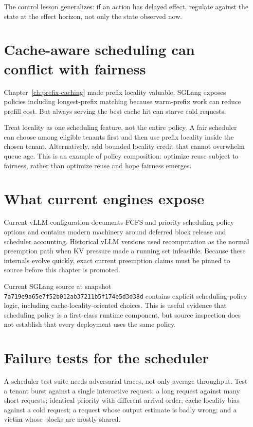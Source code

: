 The control lesson generalizes: if an action has delayed effect, regulate against the
state at the effect horizon, not only the state observed now.

\section{Cache-aware scheduling can conflict with fairness}

Chapter~\ref{ch:prefix-caching} made prefix locality valuable. SGLang exposes policies
including longest-prefix matching because warm-prefix work can reduce prefill cost.
But always serving the best cache hit can starve cold requests.

Treat locality as one scheduling feature, not the entire policy. A fair scheduler can
choose among eligible tenants first and then use prefix locality inside the chosen
tenant. Alternatively, add bounded locality credit that cannot overwhelm queue age.
This is an example of policy composition: optimize reuse subject to fairness, rather
than optimize reuse and hope fairness emerges.

\section{What current engines expose}

Current vLLM configuration documents FCFS and priority scheduling policy options and
contains modern machinery around deferred block release and scheduler accounting.
Historical vLLM versions used recomputation as the normal preemption path when KV
pressure made a running set infeasible. Because these internals evolve quickly, exact
current preemption claims must be pinned to source before this chapter is promoted.

Current SGLang source at snapshot
\texttt{7a719e9a65e7f52b012ab37211b5f174e5d3d38d} contains explicit scheduling-policy
logic, including cache-locality-oriented choices. This is useful evidence that
scheduling policy is a first-class runtime component, but source inspection does not
establish that every deployment uses the same policy.

\section{Failure tests for the scheduler}

A scheduler test suite needs adversarial traces, not only average throughput.
Test a tenant burst against a single interactive request; a long request against many
short requests; identical priority with different arrival order; cache-locality bias
against a cold request; a request whose output estimate is badly wrong; and a victim
whose blocks are mostly shared.

